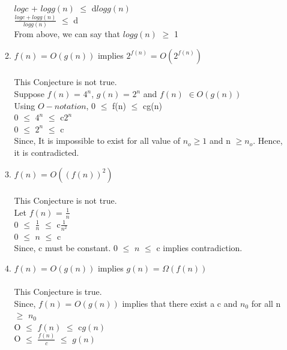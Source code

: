\documentclass{article}
\begin{document}
\begin{enumerate}
\begin{enumerate}
    $log c$ + $log g(n)$ $\leq$ d$log g(n)$\\
    $\frac{log c + log g(n)}{log g(n)}$ $\leq$ d\\
    From above, we can say that $log g(n)$ $\geq$ 1
    \item $f(n)$ = $O(g(n))$  implies $2 ^ {f(n)}$ = $O(2 ^ {f(n)})$\\\\
    This Conjecture is not true.\\
    Suppose $f(n)$ = $4^n$, $g(n)$ = $2^n$  and $f(n)$ $\in O(g(n))$ \\
    Using $O-notation$, 0 $\leq$  f(n) $\leq$ cg(n) \\
    0 $\leq$ $4^n$  $\leq$ c$2^n$ \\
    0 $\leq$ $2^n$ $\leq$ c \\
    Since, It is impossible to exist for all value  of $n_o \geq  1$ and n $\geq n_o$. Hence, it is contradicted.\\
    \item $f(n)$ = $O((f(n))^2)$\\\\
    This Conjecture is not true.\\
    Let $f(n)$ = $\frac{1}{n}$\\
    0 $\leq$ $\frac{1}{n}$ $\leq$ c$\frac{1}{n^2}$\\
    0 $\leq$ $n$ $\leq$ c \\
    Since, c must be constant. 0 $\leq$ $n$ $\leq$ c implies contradiction.\\ 
    \item $f(n)$ = $O(g(n))$ implies $g(n)$ = $\Omega(f(n))$\\\\
    
    This Conjecture is true.\\
    Since, $f(n)$ = $O(g(n))$ implies that there exist a c and $n_0$ for all n $\geq$ $n_0$\\
    O $\leq$ $f(n)$ $\leq$ c$g(n)$\\
    O $\leq$ $\frac{f(n)}{c}$ $\leq$ $g(n)$\\
    

\end{enumerate}
\end{enumerate}
\end{document}
